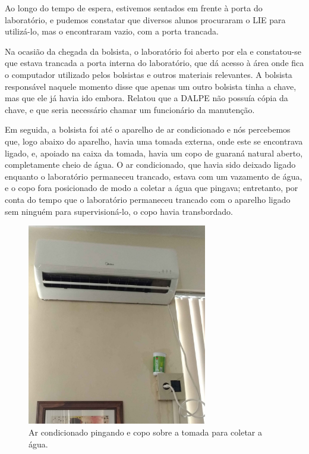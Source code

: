 Ao longo do tempo de espera, estivemos sentados em frente à porta do laboratório, e pudemos constatar que diversos alunos procuraram o LIE para utilizá-lo, mas o encontraram vazio, com a porta trancada.


Na ocasião da chegada da bolsista, o laboratório foi aberto por ela e constatou-se que estava trancada a porta interna do laboratório, que dá acesso à área onde fica o computador utilizado pelos bolsistas e outros materiais relevantes. A bolsista responsável naquele momento disse que apenas um outro bolsista tinha a chave, mas que ele já havia ido embora. Relatou que a DALPE não possuía cópia da chave, e que seria necessário chamar um funcionário da manutenção.

Em seguida, a bolsista foi até o aparelho de ar condicionado e nós percebemos que, logo abaixo do aparelho, havia uma tomada externa, onde este se encontrava ligado, e, apoiado na caixa da tomada, havia um copo de guaraná natural aberto, completamente cheio de água. O ar condicionado, que havia sido deixado ligado enquanto o laboratório permaneceu trancado, estava com um vazamento de água, e o copo fora posicionado de modo a coletar a água que pingava; entretanto, por conta do tempo que o laboratório permaneceu trancado com o aparelho ligado sem ninguém para supervisioná-lo, o copo havia transbordado.

\begin{figure}[ht]
  \centering
  \includegraphics[width=0.7\textwidth]{imagens/copo.jpg}
  \caption{Ar condicionado pingando e copo sobre a tomada para coletar a água.}
  \label{fig:LABEL_FIG_COPO}
\end{figure}

